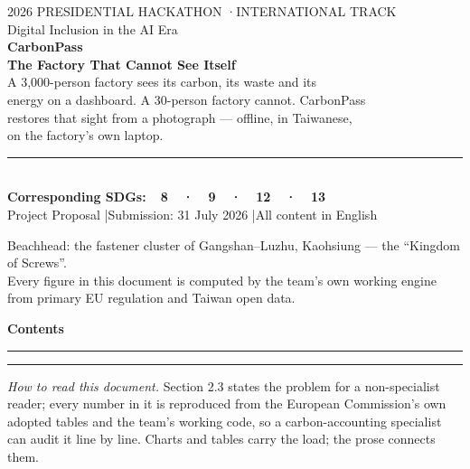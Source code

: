 \documentclass[11pt]{article}
\begin{document}
\thispagestyle{empty}
\noindent\colorbox{cpdark}{\begin{minipage}[t][297mm][t]{210mm}
\vspace{34mm}
\hspace{20mm}\begin{minipage}{170mm}
\color{white}\sffamily
{\fontsize{13}{16}\selectfont\color{cpgreen}2026 PRESIDENTIAL HACKATHON \quad·\quad INTERNATIONAL TRACK}\\[3mm]
{\fontsize{12}{15}\selectfont\color{white!70}Digital Inclusion in the AI Era}\\[22mm]
{\fontsize{62}{66}\selectfont\bfseries CarbonPass}\\[8mm]
{\fontsize{21}{27}\selectfont\color{cpgreen}\bfseries The Factory That Cannot See Itself}\\[6mm]
{\fontsize{15}{21}\selectfont\color{white!85} A 3{,}000-person factory sees its carbon, its waste and its\\ energy on a dashboard. A 30-person factory cannot. CarbonPass\\ restores that sight from a photograph --- offline, in Taiwanese,\\ on the factory's own laptop.}\\[22mm]
{\color{linegrey}\rule{150mm}{0.4pt}}\\[6mm]
{\fontsize{12}{18}\selectfont\color{white!80}\bfseries Corresponding SDGs:\ \ \color{cpgreen}8\ \ ·\ \ 9\ \ ·\ \ 12\ \ ·\ \ 13}\\[3mm]
{\fontsize{11}{16}\selectfont\color{white!60}Project Proposal \quad|\quad Submission: 31 July 2026 \quad|\quad All content in English}
\end{minipage}
\vfill
\hspace{20mm}\begin{minipage}{170mm}
\color{white!45}\sffamily\footnotesize
Beachhead: the fastener cluster of Gangshan--Luzhu, Kaohsiung --- the ``Kingdom of Screws''.\\
Every figure in this document is computed by the team's own working engine from primary EU regulation and Taiwan open data.
\end{minipage}
\vspace{18mm}
\end{minipage}}
\clearpage
\restoregeometry
\justifying

\thispagestyle{fancy}
{\sffamily\Large\bfseries\color{cpdark}Contents}\vspace{2mm}
{\color{linegrey}\hrule}\vspace{4mm}
\renewcommand{\contentsname}{\vspace{-8mm}}
\setcounter{tocdepth}{2}
\tableofcontents
\vspace{4mm}
{\color{linegrey}\hrule}
\vspace{3mm}
{\small\color{cpgrey}\emph{How to read this document.} Section 2.3 states the problem for a non-specialist reader; every number in it is reproduced from the European Commission's own adopted tables and the team's working code, so a carbon-accounting specialist can audit it line by line. Charts and tables carry the load; the prose connects them.}
\end{document}
